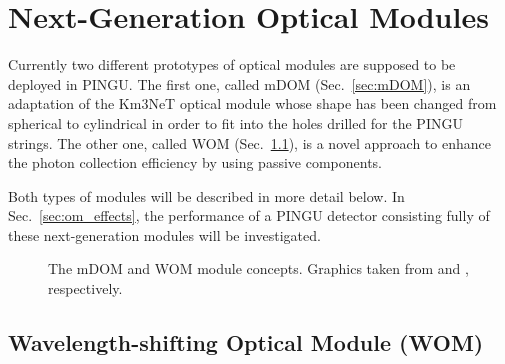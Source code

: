 \section{Next-Generation Optical Modules}
\label{sec:Gen2DOM}

Currently two different prototypes of optical modules are supposed to be
deployed in PINGU. The first one, called mDOM (Sec.~\ref{sec:mDOM}), is an
adaptation of the Km3NeT optical module \cite{Km3NeTmodule} whose shape has been
changed from spherical to cylindrical in order to fit into the holes drilled for
the PINGU strings. The other one, called WOM (Sec.~\ref{sec:WOM}), is a novel
approach to enhance the photon collection efficiency by using passive
components.

Both types of modules will be described in more detail below. In
Sec.~\ref{sec:om_effects}, the performance of a PINGU detector consisting fully
of these next-generation modules will be investigated.


\begin{figure}
\centering
  \qquad
  \caption{The \protect{} mDOM and \protect{} WOM
    module concepts. Graphics taken from \cite{mDOM_Geneva} and \cite{WOM_ICRC},
    respectively.}
\label{fig:Gen3modules}
\end{figure}


\subsection{Wavelength-shifting Optical Module (WOM)}
\label{sec:WOM}


